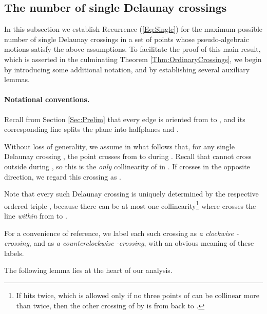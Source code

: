 \documentclass[letter,11pt]{article}
\begin{document}
\subsection{The number of single Delaunay crossings}\label{Subsec:Single}
In this subsection we establish Recurrence (\ref{Eq:Single}) for the maximum possible number  of single Delaunay crossings in a set  of  points whose pseudo-algebraic motions satisfy the above assumptions.
To facilitate the proof of this main result, which is asserted in the culminating Theorem \ref{Thm:OrdinaryCrossings}, we begin by introducing some additional notation, and by establishing several auxiliary lemmas.

\paragraph{Notational conventions.}
Recall from Section \ref{Sec:Prelim} that every edge  is oriented from  to , and its corresponding line  splits the plane into halfplanes  and .

Without loss of generality, we assume in what follows that, for any single Delaunay crossing , the point  crosses  from  to  during . Recall that  cannot cross  outside  during , so this is the {\it only} collinearity of  in .
If  crosses  in the opposite direction, we regard this crossing as .

Note that every such Delaunay crossing  is uniquely determined by the respective ordered triple , because there can be at most one collinearity\footnote{If  hits  twice, which is allowed only if no three points of  can be collinear more than twice, then the other crossing of  by  is from  back to .} where  crosses the line  {\it within } from  to .

For a convenience of reference, we label each such crossing  as {\it a clockwise -crossing}, and as {\it a counterclockwise -crossing}, with an obvious meaning of these labels.



The following lemma lies at the heart of our analysis.
\end{document}
